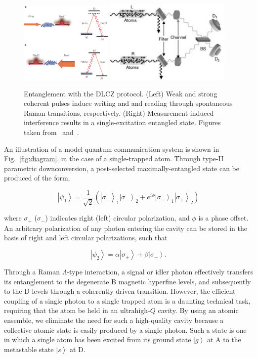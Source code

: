 \documentclass[aps,twocolumn,secnumarabic,amsmath,amssymb,pra,groupedaddress,
showpacs, showkeys]{revtex4-1}
\newcommand{\ket}[1]{\left|#1\right\rangle}
\newcommand{\pna}[1]{\left(#1\right)}
\newcommand{\eqn}[1]{
\begin{equation}
	#1
\end{equation}
}
\begin{document}
\begin{figure}[t]
	\centering
	\includegraphics[width=0.40\textwidth]{figures/dlcz}
  	\includegraphics[width=0.55\textwidth]{figures/dlcz_entanglement}
	\caption{Entanglement with the DLCZ protocol. (Left) Weak and strong coherent pulses induce writing and and reading through spontaneous Raman transitions, respectively. (Right) Measurement-induced interference results in a single-excitation entangled state.  Figures taken from~\cite{nature07127} and~\cite{nature35106500}.}
	\label{fig:dlcz}
\end{figure}

An illustration of a model quantum communication system is shown in
Fig.~\ref{fig:diagram}, in the case of a single-trapped atom. Through type-II
parametric downconversion, a post-selected maximally-entangled state can be
produced of the form,
\eqn{
\ket{\psi_1} = \frac{1}{\sqrt{2}}\pna{\ket{\sigma_{+}}_1\ket{\sigma_{-}}_2 + e^{i\phi} \ket{\sigma_{-}}_1 \ket{\sigma_{+}}_2 } \label{eqn:singlet}
}
where $\sigma_{+}$ ($\sigma_{-}$) indicates right (left) circular polarization,
and $\phi$ is a phase offset. An arbitrary polarization of any photon entering
the cavity can be stored in the basis of right and left circular polarizations,
such that
\eqn{
\ket{\psi_2} = \alpha \ket{\sigma_{+}}+\beta \ket{\sigma_{-}}.
}
Through a Raman $\Lambda$-type interaction, a signal or idler photon
effectively transfers its entanglement to the degenerate B magnetic hyperfine
levels, and subsequently to the D levels through a coherently-driven
transition. However, the efficient coupling of a single photon to a single
trapped atom is a daunting technical task, requiring that the atom be held in
an ultrahigh-$Q$ cavity. By using an atomic ensemble, we eliminate the need for
such a high-quality cavity because a collective atomic state is easily produced
by a single photon. Such a state is one in which a single atom has been excited
from its ground state $\ket{g}$ at A to the metastable state $\ket{s}$ at D. 
\end{document}
